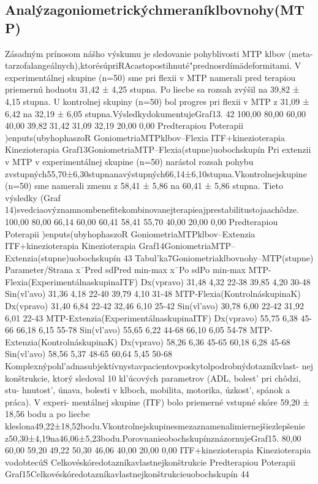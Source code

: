 \subsection{Analýzagoniometrickýchmeraníklbovnohy(MTP)}

Zásadným prínosom nášho výskumu je sledovanie pohyblivosti MTP klbov (meta- tarzofalangeálnych),ktorésúpriRAcastopostihnuté"prednosrdímädeformitami. V experimentálnej skupine (n=50) sme pri flexii v MTP namerali pred terapiou priemernú hodnotu 31,42 ± 4,25 stupna. Po liecbe sa rozsah zvýšil na 39,82 ± 4,15 stupna. U kontrolnej skupiny (n=50) bol progres pri flexii v MTP z 31,09 ± 6,42 na 32,19 ± 6,05 stupna.VýsledkydokumentujeGraf13. 42 100,00 80,00 60,00 40,00 39,82 31,42 31,09 32,19 20,00 0,00 Predterapiou Poterapii )enputs(ubyhophaszoR GoniometriaMTPklbov--Flexia ITF+kinezioterapia Kinezioterapia Graf13GoniometriaMTP--Flexia(stupne)uobochskupín Pri extenzii v MTP v experimentálnej skupine (n=50) narástol rozsah pohybu zvstupných55,70±6,30stupnanavýstupných66,14±6,10stupna.Vkontrolnejskupine (n=50) sme namerali zmenu z 58,41 ± 5,86 na 60,41 ± 5,86 stupna. Tieto výsledky (Graf 14)svedciaovýznamnombenefitekombinovanejterapieajprestabilitustojaachôdze. 100,00 80,00 66,14 60,00 60,41 58,41 55,70 40,00 20,00 0,00 Predterapiou Poterapii )enputs(ubyhophaszoR GoniometriaMTPklbov--Extenzia ITF+kinezioterapia Kinezioterapia Graf14GoniometriaMTP--Extenzia(stupne)uobochskupín 43 Tabul’ka7Goniometriaklbovnohy--MTP(stupne) Parameter/Strana x¯Pred sdPred min-max x¯Po sdPo min-max MTP-Flexia(ExperimentálnaskupinaITF) Dx(vpravo) 31,48 4,32 22-38 39,85 4,20 30-48 Sin(vl’avo) 31,36 4,18 22-40 39,79 4,10 31-48 MTP-Flexia(KontrolnáskupinaK) Dx(vpravo) 31,40 6,84 22-42 32,46 6,10 25-42 Sin(vl’avo) 30,78 6,00 22-42 31,92 6,01 22-43 MTP-Extenzia(ExperimentálnaskupinaITF) Dx(vpravo) 55,75 6,38 45-66 66,18 6,15 55-78 Sin(vl’avo) 55,65 6,22 44-68 66,10 6,05 54-78 MTP-Extenzia(KontrolnáskupinaK) Dx(vpravo) 58,26 6,36 45-65 60,18 6,28 45-68 Sin(vl’avo) 58,56 5,37 48-65 60,64 5,45 50-68 Komplexnýpohl’adnasubjektívnystavpacientovposkytolpodrobnýdotazníkvlast- nej konštrukcie, ktorý sledoval 10 kl’úcových parametrov (ADL, bolest’ pri chôdzi, stu- hnutost’, únava, bolesti v klboch, mobilita, motorika, úzkost’, spánok a práca). V experi- mentálnej skupine (ITF) bolo priemerné vstupné skóre 59,20 ± 18,56 bodu a po liecbe kleslona49,22±18,52bodu.Vkontrolnejskupinesmezaznamenalimiernejšiezlepšenie z50,30±4,19na46,06±5,23bodu.PorovnanieobochskupínznázornujeGraf15. 80,00 60,00 59,20 49,22 50,30 46,06 40,00 20,00 0,00 ITF+kinezioterapia Kinezioterapia vodobtecúS Celkovéskóredotazníkavlastnejkonštrukcie Predterapiou Poterapii Graf15Celkovéskóredotazníkavlastnejkonštrukcieuobochskupín 44



